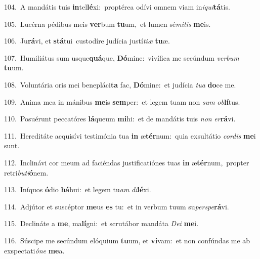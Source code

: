 {\numbfont\textcolor{\numbcolor}{104.}}~A mandátis tuis \textbf{in}\-tel\-\textbf{lé}\-xi:~\star proptérea odívi omnem viam in\-\textit{i}\-\textit{qui}\textbf{tá}tis.\par
{\numbfont\textcolor{\numbcolor}{105.}}~Lucérna pédibus meis \textbf{ver}\-bum \textbf{tu}\-um,~\star et lumen sé\-\textit{mi}\-\textit{tis} \textbf{me}\-is.\par
{\numbfont\textcolor{\numbcolor}{106.}}~Ju\-\textbf{rá}\-vi, et \textbf{stá}\-tui~\star custodíre judícia justí\-\textit{ti}\-\textit{æ} \textbf{tu}\-æ.\par
{\numbfont\textcolor{\numbcolor}{107.}}~Humiliátus sum usque\-\textbf{quá}\-que, \textbf{Dó}\-mine:~\star vivífica me secúndum \textit{ver}\-\textit{bum} \textbf{tu}\-um.\par
{\numbfont\textcolor{\numbcolor}{108.}}~Voluntária oris mei benepláci\textbf{ta} fac, \textbf{Dó}\-mine:~\star et judícia \textit{tu}\-\textit{a} \textbf{do}\-ce me.\par
{\numbfont\textcolor{\numbcolor}{109.}}~Anima mea in mánibus \textbf{me}\-is \textbf{sem}\-per:~\star et legem tuam non \textit{sum} \textit{ob}\-\textbf{lí}tus.\par
{\numbfont\textcolor{\numbcolor}{110.}}~Posuérunt peccatóres \textbf{lá}\-queum \textbf{mi}\-hi:~\star et de mandátis tuis \textit{non} \textit{er}\-\textbf{rá}vi.\par
{\numbfont\textcolor{\numbcolor}{111.}}~Hereditáte acquisívi testimónia tua \textbf{in} æ\-\textbf{tér}\-num:~\star quia exsultátio \textit{cor}\-\textit{dis} \textbf{me}\-i sunt.\par
{\numbfont\textcolor{\numbcolor}{112.}}~Inclinávi cor meum ad faciéndas justificatiónes tuas \textbf{in} æ\-\textbf{tér}\-num,~\star propter retri\-\textit{bu}\-\textit{ti}\textbf{ó}nem.\par
{\numbfont\textcolor{\numbcolor}{113.}}~Iníquos \textbf{ó}\-dio \textbf{há}\-bui:~\star et legem tu\textit{am} \textit{di}\-\textbf{lé}xi.\par
{\numbfont\textcolor{\numbcolor}{114.}}~Adjútor et suscéptor \textbf{me}\-us \textbf{es} tu:~\star et in verbum tuum su\-\textit{per}\-\textit{spe}\textbf{rá}vi.\par
{\numbfont\textcolor{\numbcolor}{115.}}~Declináte a \textbf{me}\-, ma\-\textbf{lí}\-gni:~\star et scrutábor mandáta \textit{De}\-\textit{i} \textbf{me}\-i.\par
{\numbfont\textcolor{\numbcolor}{116.}}~Súscipe me secúndum elóquium \textbf{tu}\-um, et \textbf{vi}\-vam:~\star et non confúndas me ab exspectati\-\textit{ó}\-\textit{ne} \textbf{me}\-a.\par
